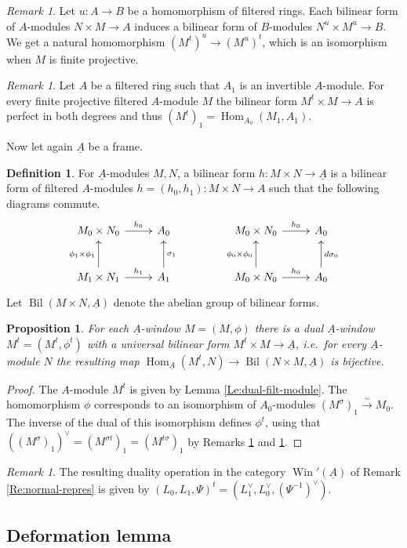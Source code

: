 \documentclass[a4paper,11pt]{amsart}
\theoremstyle{plain}
\newtheorem{Prop}[equation]{Proposition}
\theoremstyle{definition}
\newtheorem{Defn}[equation]{Definition}
\theoremstyle{remark}
\newtheorem{Remark}[equation]{Remark}
\newcommand{\bPr}{\begin{Prop}}
\newcommand{\ePr}{\end{Prop}}
\newcommand{\bDe}{\begin{Defn}}
\newcommand{\eDe}{\end{Defn}}
\newcommand{\bRe}{\begin{Remark}}
\newcommand{\eRe}{\end{Remark}}
\newcommand{\bproof}{\begin{proof}}
\newcommand{\eproof}{\end{proof}}
\renewcommand{\u}{\underline}
\newcommand{\uM}{M} %
\newcommand{\uN}{N} %
\numberwithin{equation}{section}
\DeclareMathOperator{\Bil}{Bil}
\DeclareMathOperator{\Hom}{Hom}
\DeclareMathOperator{\Win}{Win}
\begin{document}
\bRe
\label{Re:bil-filt-funct}
Let $u:A\to B$ be a homomorphism of filtered rings. Each bilinear form of $A$-modules $N\times M\to A$ induces a bilinear form of $B$-modules $N^u\times M^u\to B$. We get a natural homomorphism $(M^t)^u\to(M^u)^t$, which is an isomorphism when $M$ is finite projective.
\eRe

\bRe
\label{Re:bil-filt-Cartier}
Let $A$ be a filtered ring such that $A_1$ is an invertible $A$-module. For every finite projective filtered $A$-module $M$ the bilinear form $M^t\times M\to A$ is perfect in both degrees and thus $(M^t)_1=\Hom_{A_0}(M_1,A_1)$. 
\eRe

Now let again $\u A$ be a frame.

\bDe
For $\u A$-modules $\uM,\uN$, a bilinear form $h\colon\uM\times\uN\to\u A$ is a bilinear form of filtered $A$-modules $h=(h_0,h_1)\colon M\times N\to A$ such that the following diagrams commute. 
\[
\xymatrix@M+0.2em{
M_0 \times N_0 \ar[r]^-{h_0} & A_0 \\
M_1\times N_1 \ar[u]^{\phi_1\times\phi_1} \ar[r]^-{h_1} & A_1 \ar[u]_{\sigma_1}
}
\qquad
\qquad
\xymatrix@M+0.2em{
M_0 \times N_0 \ar[r]^-{h_0} & A_0 \\
M_0\times N_0 \ar[u]^{\phi_0\times\phi_0} \ar[r]^-{h_0} & A_0 \ar[u]_{d\sigma_0}
}
\]
Let $\Bil(M\times N,\u A)$ denote the abelian group of bilinear forms.
\eDe

\bPr
For each $\u A$-window $\uM=(M,\phi)$ there is a dual $\u A$-window $\uM^t=(M^t,\phi^t)$ with a universal bilinear form $\uM^t\times\uM\to\u A$, i.e.\ for every $\u A$-module $\uN$ the resulting map $\Hom_{\u A}(\uM^t,\uN)\to\Bil(\uN\times\uM,\u A)$ is bijective.
\ePr

\bproof
The $A$-module $M^t$ is given by Lemma \ref{Le:dual-filt-module}. The homomorphism $\phi$ corresponds to an isomorphism of $A_0$-modules $(M^\sigma)_1\xrightarrow\sim M_0$. The inverse of the dual of this isomorphism defines $\phi^t$, 
using that $((M^\sigma)_1)^\vee=(M^{\sigma t})_1=(M^{t\sigma})_1$ by Remarks \ref{Re:bil-filt-Cartier} and \ref{Re:bil-filt-funct}.
\eproof

\bRe
\label{Re:dual-normal-decomp}
The resulting duality operation in the category $\Win'(\u A)$ of Remark \ref{Re:normal-repres} is given by $(L_0,L_1,\Psi)^t=(L_1^\vee,L_0^\vee,(\Psi^{-1})^\vee)$.
\eRe

\subsection{Deformation lemma}
\end{document}
